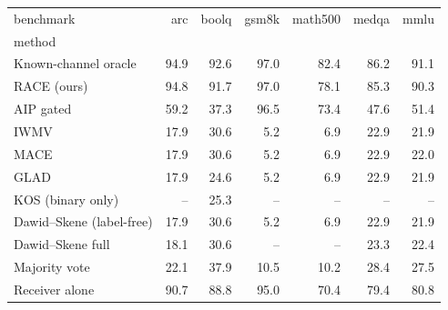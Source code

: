 \begin{tabular}{lrrrrrr}
\toprule
benchmark & arc & boolq & gsm8k & math500 & medqa & mmlu \\
method &  &  &  &  &  &  \\
\midrule
Known-channel oracle & 94.9 & 92.6 & 97.0 & 82.4 & 86.2 & 91.1 \\
RACE (ours) & 94.8 & 91.7 & 97.0 & 78.1 & 85.3 & 90.3 \\
AIP gated & 59.2 & 37.3 & 96.5 & 73.4 & 47.6 & 51.4 \\
IWMV & 17.9 & 30.6 & 5.2 & 6.9 & 22.9 & 21.9 \\
MACE & 17.9 & 30.6 & 5.2 & 6.9 & 22.9 & 22.0 \\
GLAD & 17.9 & 24.6 & 5.2 & 6.9 & 22.9 & 21.9 \\
KOS (binary only) & -- & 25.3 & -- & -- & -- & -- \\
Dawid–Skene (label-free) & 17.9 & 30.6 & 5.2 & 6.9 & 22.9 & 21.9 \\
Dawid–Skene full & 18.1 & 30.6 & -- & -- & 23.3 & 22.4 \\
Majority vote & 22.1 & 37.9 & 10.5 & 10.2 & 28.4 & 27.5 \\
Receiver alone & 90.7 & 88.8 & 95.0 & 70.4 & 79.4 & 80.8 \\
\bottomrule
\end{tabular}
